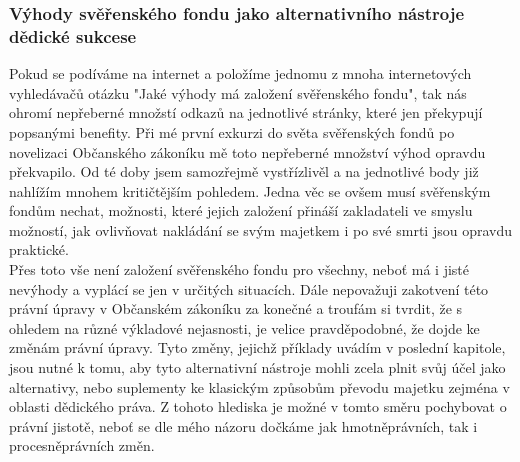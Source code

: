 \documentclass{article}
\begin{document}
\subsubsection{Výhody svěřenského fondu jako alternativního nástroje dědické sukcese}




Pokud se podíváme na internet a položíme jednomu z mnoha internetových vyhledávačů otázku "Jaké výhody má založení svěřenského fondu", tak nás ohromí nepřeberné množstí odkazů na jednotlivé stránky, které jen překypují popsanými benefity. Při mé první exkurzi do světa svěřenských fondů po novelizaci Občanského zákoníku mě toto nepřeberné množství výhod opravdu překvapilo. Od té doby jsem samozřejmě vystřízlivěl a na jednotlivé body již nahlížím mnohem kritičtějším pohledem. Jedna věc se ovšem musí svěřenským fondům nechat, možnosti, které jejich založení přináší zakladateli ve smyslu možností, jak ovlivňovat nakládání se svým majetkem i po své smrti jsou opravdu praktické.\\

Přes toto vše není založení svěřenského fondu pro všechny, neboť má i jisté nevýhody a vyplácí se jen v určitých situacích. Dále nepovažuji zakotvení této právní úpravy v Občanském zákoníku za konečné a troufám si tvrdit, že s ohledem na různé výkladové nejasnosti, je velice pravděpodobné, že dojde ke změnám právní úpravy. Tyto změny, jejichž příklady uvádím v poslední kapitole, jsou nutné k tomu, aby tyto alternativní nástroje mohli zcela plnit svůj účel jako alternativy, nebo suplementy ke klasickým způsobům převodu majetku zejména v oblasti dědického práva. Z tohoto hlediska je možné v tomto směru pochybovat o právní jistotě, neboť se dle mého názoru dočkáme jak hmotněprávních, tak i procesněprávních změn.\\
\end{document}

